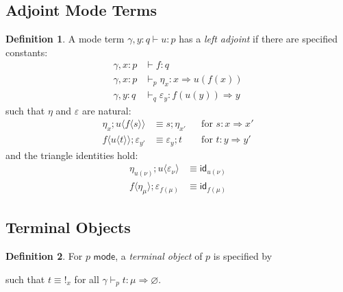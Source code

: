 \documentclass[10pt]{article}
\theoremstyle{definition}
\newtheorem{definition}{Definition}
\let\emptyset\varnothing
\newcommand{\yields}{\vdash}
\newcommand{\tcell}{\Rightarrow}
\newcommand{\type}{\,\,\mathsf{mode}}
\newcommand{\id}{\mathsf{id}}
\newcommand\TermTwoT[5]{\ensuremath{#1 \vdash_{#5} {#2} : #3 \tcell #4}}
\newcommand\TrPlus[2]{\ensuremath{{#1}^+(#2)}}
\newcommand\bang[0]{\mathord{!}}
\newcommand\ap[2]{\ensuremath{#1 \langle #2 \rangle }}
\begin{document}
\subsection{Adjoint Mode Terms}
\begin{definition}
A mode term $\gamma, y : q \yields u : p$ has a \emph{left adjoint} if there are specified constants:
\begin{align*}
\gamma, x : p &\yields f : q \\
\gamma, x : p &\yields_p \eta_x : x \tcell u(f(x)) \\
\gamma, y : q &\yields_q \varepsilon_y : f(u(y)) \tcell y
\end{align*}
such that $\eta$ and $\varepsilon$ are natural:
\begin{align}
\eta_x ; \ap{u}{\ap{f}{s}} &\equiv s ; \eta_{x'} && \text{for } s : x \tcell x'  \\
\ap{f}{\ap{u}{t}} ; \varepsilon_{y'}  &\equiv \varepsilon_y ; t && \text{for } t : y \tcell y'
\end{align}
and the triangle identities hold:
\begin{align}
\eta_{u(\nu)};\ap{u}{\varepsilon_\nu} &\equiv \id_{u(\nu)} \\
\ap{f}{\eta_\mu};\varepsilon_{f(\mu)} &\equiv \id_{f(\mu)}
\end{align}
\end{definition}

\subsection{Terminal Objects}
\newcommand\One{\ensuremath{\mathds{1}}}

\begin{definition}
For $p \type$, a \emph{terminal object} of $p$ is specified by
such that $t \equiv \bang_x$ for all $\TermTwoT{\gamma}{t}{\mu}{\emptyset}{p}$.
\end{definition}

\end{document}
